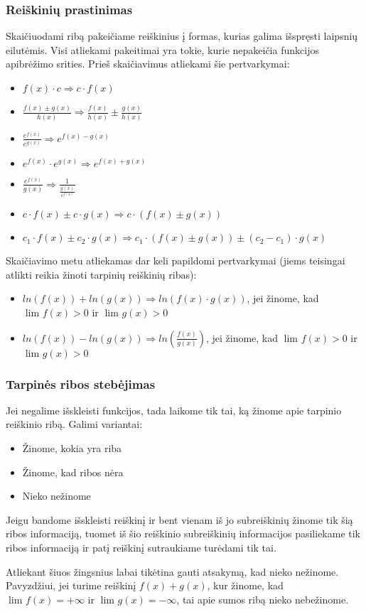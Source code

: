     \subsubsection{Reiškinių prastinimas}
        Skaičiuodami ribą pakeičiame reiškinius į formas, kurias galima išspręsti laipsnių eilutėmis. Visi atliekami pakeitimai
        yra tokie, kurie nepakeičia funkcijos apibrėžimo srities. Prieš skaičiavimus atliekami šie pertvarkymai:
        \begin{itemize}
            \item $f(x) \cdotp c \Longrightarrow c \cdot f(x)$
            \item $\frac{f(x) \pm g(x)}{h(x)} \Longrightarrow \frac{f(x)}{h(x)} \pm \frac{g(x)}{h(x)}$
            \item $\frac{e^{f(x)}}{e^{g(x)}} \Longrightarrow e^{f(x)-g(x)}$
            \item $e^{f(x)} \cdotp e^{g(x)} \Longrightarrow e^{f(x)+g(x)}$
            \item $\frac{e^{f(x)}}{g(x)} \Longrightarrow \frac{1}{\frac{g(x)}{e^{f(x)}}} $
            \item $c \cdotp f(x) \pm c \cdotp g(x) \Longrightarrow c \cdotp (f(x) \pm g(x))$
            \item $c_1 \cdotp f(x) \pm c_2 \cdotp g(x) \Longrightarrow c_1 \cdotp (f(x) \pm g(x)) \pm (c_2 - c_1) \cdot g(x)$
        \end{itemize}

        Skaičiavimo metu atliekamas dar keli papildomi pertvarkymai (jiems teisingai atlikti reikia žinoti tarpinių
        reiškinių ribas):
        \begin{itemize}
            \item $ln(f(x)) + ln(g(x)) \Longrightarrow ln(f(x) \cdotp g(x))$, jei žinome, kad $\lim_{} f(x) > 0$ ir $\lim_{} g(x) > 0$
            \item $ln(f(x)) - ln(g(x)) \Longrightarrow ln(\frac{f(x)}{g(x)})$, jei žinome, kad $\lim_{} f(x) > 0$ ir $\lim_{} g(x) > 0$
        \end{itemize}

    \subsubsection{Tarpinės ribos stebėjimas}
        Jei negalime išskleisti funkcijos, tada laikome tik tai, ką žinome apie tarpinio reiškinio ribą. Galimi variantai:
        \begin{itemize}
            \item Žinome, kokia yra riba
            \item Žinome, kad ribos nėra
            \item Nieko nežinome
        \end{itemize}
        Jeigu bandome išskleisti reiškinį ir bent vienam iš jo subreiškinių žinome tik šią ribos informaciją, tuomet iš 
        šio reiškinio subreiškinių informacijos pasiliekame tik ribos informaciją ir patį reiškinį sutraukiame turėdami
        tik tai.

        Atliekant šiuos žingsnius labai tikėtina gauti atsakymą, kad nieko nežinome. Pavyzdžiui, jei turime reiškinį
        $f(x) + g(x)$, kur žinome, kad $\lim_{} f(x) = +\infty$ ir $\lim_{} g(x) = -\infty$, tai apie sumos ribą nieko nebežinome.

	
	